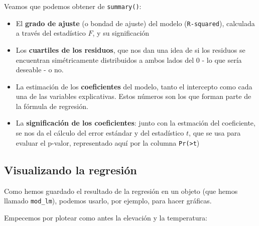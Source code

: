 \documentclass[
  letterpaper,
  DIV=11,
  numbers=noendperiod]{scrreprt}
\newenvironment{Shaded}{\begin{snugshade}}{\end{snugshade}}
\newcommand{\FunctionTok}[1]{\textcolor[rgb]{0.28,0.35,0.67}{#1}}
\newcommand{\NormalTok}[1]{\textcolor[rgb]{0.00,0.23,0.31}{#1}}
\newcommand{\SpecialCharTok}[1]{\textcolor[rgb]{0.37,0.37,0.37}{#1}}
\begin{document}
Veamos que podemos obtener de \texttt{summary()}:

\begin{itemize}
\item
  El \textbf{grado de ajuste} (o bondad de ajuste) del modelo
  (\texttt{R-squared}), calculada a través del estadístico \(F\), y su
  significación
\item
  Los \textbf{cuartiles de los residuos}, que nos dan una idea de si los
  residuos se encuentran simétricamente distribuidos a ambos lados del 0
  - lo que sería deseable - o no.
\item
  La estimación de los \textbf{coeficientes} del modelo, tanto el
  intercepto como cada una de las variables explicativas. Estos números
  son los que forman parte de la fórmula de regresión.
\item
  La \textbf{significación de los coeficientes}: junto con la estmación
  del coeficiente, se nos da el cálculo del error estándar y del
  estadístico \(t\), que se usa para evaluar el p-valor, representado
  aquí por la columna \texttt{Pr(\textgreater{}\textbar{}t\textbar{}})
\end{itemize}

\hypertarget{visualizando-la-regresiuxf3n}{%
\subsection{Visualizando la
regresión}\label{visualizando-la-regresiuxf3n}}

Como hemos guardado el resultado de la regresión en un objeto (que hemos
llamado \texttt{mod\_lm}), podemos usarlo, por ejemplo, para hacer
gráficas.

Empecemos por plotear como antes la elevación y la temperatura:

\begin{Shaded}
\end{Shaded}
\end{document}
